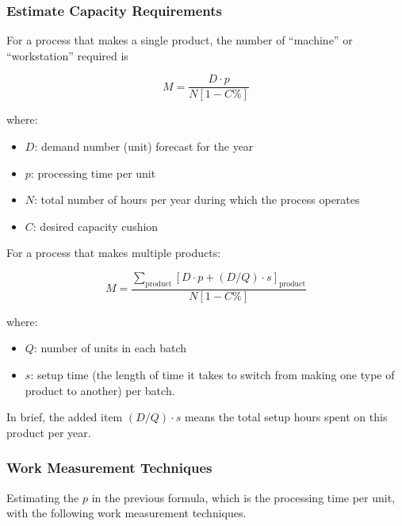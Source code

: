 \documentclass{article}
\begin{document}
\subsubsection{Estimate Capacity Requirements}

For a process that makes a single product, the number of ``machine'' or ``workstation'' required is

\[
	M = \dfrac{D \cdot p }{N\left[1 - C\%\right]}
\]

where:
\begin{itemize}
	\item $D$: demand number (unit) forecast for the year
	\item $p$: processing time per unit
	\item $N$: total number of hours per year during which the process operates
	\item $C$: desired capacity cushion
\end{itemize}

For a process that makes multiple products:

\[
	M = \dfrac{
	\sum \limits _{\text{product}} \left[D\cdot p + (D/Q)\cdot s\right]_{\text{product}}
	}{N\left[1-C\%\right]}
\]

where:
\begin{itemize}
	\item $Q$: number of units in each batch
	\item $s$: setup time (the length of time it takes to switch from making one type of product to another) per batch.
\end{itemize}

In brief, the added item $(D/Q)\cdot s$ means the total setup hours spent on this product per year.

\subsubsection{Work Measurement Techniques}

Estimating the $p$ in the previous formula, which is the processing time per unit,
with the following work measurement techniques.
\end{document}

